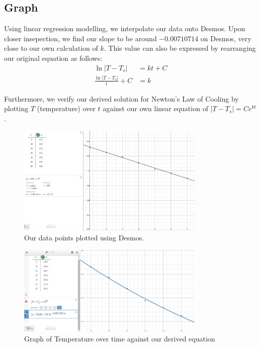 \documentclass{article}
\begin{document}
\subsection{Graph}
Using linear regression modelling, we interpolate our data onto Desmos. Upon closer insepection, we find our slope to be around $-0.00710714$ on Desmos, very close to our own calculation of $k$. This value can also be expressed by rearranging our original equation as follows:
\begin{align}
    \ln|T-T_s| &= kt+C\\
    \frac{\ln|T-T_s|}{t}+C &=k
\end{align}

\newpage
Furthermore, we verify our derived solution for Newton's Law of Cooling by plotting $T$ (temperature) over $t$ against our own linear equation of $\boxed{|T-T_s| = Ce^{kt}}$.\\



\begin{figure}[t]
\centering
\includegraphics[width=0.8\textwidth]{graph.jpg}
\caption{Our data points plotted using Desmos.}
    \label{fig:my_label}
\end{figure}

\begin{figure}[h]
    \centering
    \includegraphics[width=0.8\textwidth]{Tvst.jpg}
    \caption{Graph of Temperature over time against our derived equation}
    \label{fig:my_label}
\end{figure}
\end{document}
